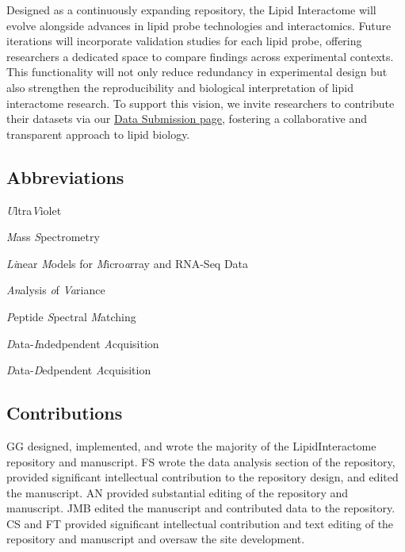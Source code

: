 \documentclass[
  letterpaper,
  DIV=11,
  numbers=noendperiod]{scrartcl}
\providecommand{\tightlist}{%
  \setlength{\itemsep}{0pt}\setlength{\parskip}{0pt}}\usepackage{longtable,booktabs,array}
\begin{document}
Designed as a continuously expanding repository, the Lipid Interactome
will evolve alongside advances in lipid probe technologies and
interactomics. Future iterations will incorporate validation studies for
each lipid probe, offering researchers a dedicated space to compare
findings across experimental contexts. This functionality will not only
reduce redundancy in experimental design but also strengthen the
reproducibility and biological interpretation of lipid interactome
research. To support this vision, we invite researchers to contribute
their datasets via our
\href{https://lipidinteractome.org/contactus/datasubmission}{Data
Submission page}, fostering a collaborative and transparent approach to
lipid biology.

\subsection{Abbreviations}\label{abbreviations}

\begin{description}
\tightlist
\item[UV]
\emph{U}ltra\emph{V}iolet
\item[MS]
\emph{M}ass \emph{S}pectrometry
\item[LIMMA]
\emph{Li}near \emph{M}odels for \emph{M}icro\emph{a}rray and RNA-Seq
Data
\item[ANOVA]
\emph{An}alysis \emph{o}f \emph{Va}riance
\item[PSM]
\emph{P}eptide \emph{S}pectral \emph{M}atching
\item[DIA]
\emph{D}ata-\emph{I}ndedpendent \emph{A}cquisition
\item[DDA]
\emph{D}ata-\emph{D}edpendent \emph{A}cquisition
\end{description}

\subsection{Contributions}\label{contributions}

GG designed, implemented, and wrote the majority of the LipidInteractome
repository and manuscript. FS wrote the data analysis section of the
repository, provided significant intellectual contribution to the
repository design, and edited the manuscript. AN provided substantial
editing of the repository and manuscript. JMB edited the manuscript and
contributed data to the repository. CS and FT provided significant
intellectual contribution and text editing of the repository and
manuscript and oversaw the site development.
\end{document}
